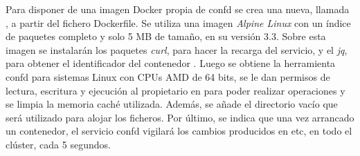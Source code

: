 Para disponer de una imagen Docker propia de confd se crea una nueva, llamada , a partir del fichero Dockerfile. Se utiliza una imagen \textit{Alpine Linux} con un índice de paquetes completo y solo 5 MB de tamaño, en su versión 3.3. Sobre esta imagen se instalarán los paquetes \textit{curl}, para hacer la recarga del servicio, y el \textit{jq}, para obtener el identificador del contenedor . Luego se obtiene la herramienta confd para sistemas Linux con CPUs AMD de 64 bits, se le dan permisos de lectura, escritura y ejecución al propietario en  para poder realizar operaciones y se limpia la memoria caché utilizada. Además, se añade el directorio vacío  que será utilizado para alojar los ficheros. Por último, se indica que una vez arrancado un contenedor, el servicio confd vigilará los cambios producidos en etc, en todo el clúster, cada 5 segundos.

